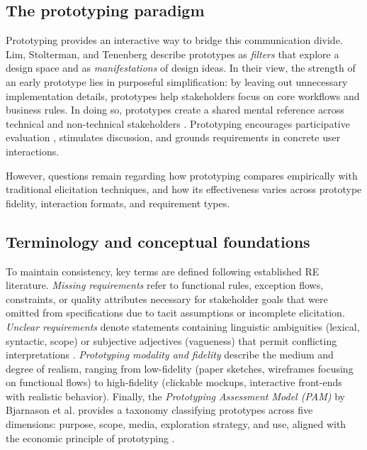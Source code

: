 \subsection{The prototyping paradigm}
Prototyping provides an interactive way to bridge this communication divide. Lim, Stolterman, and Tenenberg \cite{lim2008anatomy} describe prototypes as \textit{filters} that explore a design space and as \textit{manifestations} of design ideas. In their view, the strength of an early prototype lies in purposeful simplification: by leaving out unnecessary implementation details, prototypes help stakeholders focus on core workflows and business rules. In doing so, prototypes create a shared mental reference across technical and non-technical stakeholders \cite{bjarnason2023empirically}. Prototyping encourages participative evaluation \cite{hickey1998prototyping}, stimulates discussion, and grounds requirements in concrete user interactions.

However, questions remain regarding how prototyping compares empirically with traditional elicitation techniques, and how its effectiveness varies across prototype fidelity, interaction formats, and requirement types.

\subsection{Terminology and conceptual foundations}
To maintain consistency, key terms are defined following established RE literature. \textit{Missing requirements} refer to functional rules, exception flows, constraints, or quality attributes necessary for stakeholder goals that were omitted from specifications due to tacit assumptions or incomplete elicitation. \textit{Unclear requirements} denote statements containing linguistic ambiguities (lexical, syntactic, scope) or subjective adjectives (vagueness) that permit conflicting interpretations \cite{cascon2025ambiguity, berry2003contract}. \textit{Prototyping modality and fidelity} describe the medium and degree of realism, ranging from low-fidelity (paper sketches, wireframes focusing on functional flows) to high-fidelity (clickable mockups, interactive front-ends with realistic behavior). Finally, the \textit{Prototyping Assessment Model (PAM)} by Bjarnason et al. \cite{bjarnason2023empirically} provides a taxonomy classifying prototypes across five dimensions: purpose, scope, media, exploration strategy, and use, aligned with the economic principle of prototyping \cite{lim2008anatomy}.


